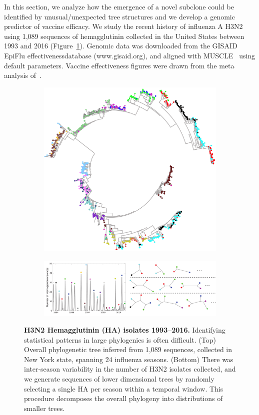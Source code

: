 \documentclass[a4paper,11pt]{article}
\begin{document}
In this section, we analyze how the emergence of a novel subclone could be identified by unusual/unexpected tree structures and we develop a genomic predictor of vaccine efficacy.
We study the recent history of influenza A H3N2 using 1,089 sequences of hemagglutinin collected in the United States between 1993 and 2016 (Figure~\ref{fig:flu_HA_sampling}).
Genomic data was downloaded from the GISAID EpiFlu effectivenessdatabase (www.gisaid.org), and aligned with MUSCLE~\cite{edgar2004muscle} using default parameters.
Vaccine effectiveness figures were drawn from the meta analysis of~\cite{gupta2006quantifying}.

\begin{figure}
    \begin{subfigure}{\linewidth}
    \centering
    \includegraphics[width=0.8\linewidth]{../figures/influenza_HA_tree.png}
    \end{subfigure}
    
    \begin{subfigure}{\linewidth}
    \centering
    \includegraphics[width=\linewidth]{../figures/influenza_seasonal_sampling.pdf}
    \end{subfigure}

    \caption{{\bf H3N2 Hemagglutinin (HA) isolates 1993--2016.} Identifying statistical patterns in large phylogenies is often difficult. (Top) Overall phylogenetic tree inferred from 1,089 sequences, collected in New York state, spanning 24 influenza seasons. (Bottom) There was inter-season variability in the number of H3N2 isolates collected, and we generate sequences of lower dimensional trees by randomly selecting a single HA per season within a temporal window. This procedure decomposes the overall phylogeny into distributions of smaller trees.}
    \label{fig:flu_HA_sampling}
\end{figure}
\end{document}
